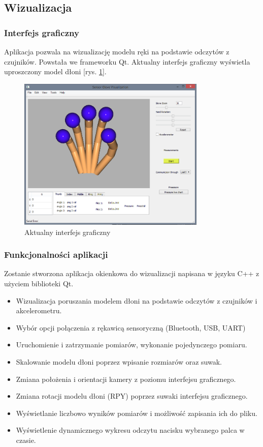 \documentclass[12pt,a4paper]{article}
\begin{document}
\subsection{Wizualizacja}
\subsubsection{Interfejs graficzny}
Aplikacja pozwala na wizualizację modelu ręki na podstawie odczytów z czujników. Powstała we frameworku Qt. Aktualny interfejs graficzny wyświetla uproszczony model dłoni [rys. \ref{fig:wds}].

\begin{figure}[htb!]
\centering
\includegraphics[width=0.8\textwidth]{images/aktualnyinterfejsgraficzny.png}
\caption{Aktualny interfejs graficzny}
\label{fig:wds}
\end{figure}

\subsubsection{Funkcjonalności aplikacji}
Zostanie stworzona aplikacja okienkowa do wizualizacji napisana w języku C++ z użyciem biblioteki Qt.\\
\begin{itemize}
\item Wizualizacja poruszania modelem dłoni na podstawie odczytów z czujników i akcelerometru.
\item Wybór opcji połączenia z rękawicą sensoryczną (Bluetooth, USB, UART)
\item Uruchomienie i zatrzymanie pomiarów, wykonanie pojedynczego pomiaru.
\item Skalowanie modelu dłoni poprzez wpisanie rozmiarów oraz suwak.
\item Zmiana położenia i orientacji kamery z poziomu interfejsu graficznego.
\item Zmiana rotacji modelu dłoni (RPY) poprzez suwaki interfejsu graficznego.
\item Wyświetlanie liczbowo wyników pomiarów i możliwość zapisania ich do pliku.
\item Wyświetlenie dynamicznego wykresu odczytu nacisku wybranego palca w czasie.
\end{itemize}
\end{document}
